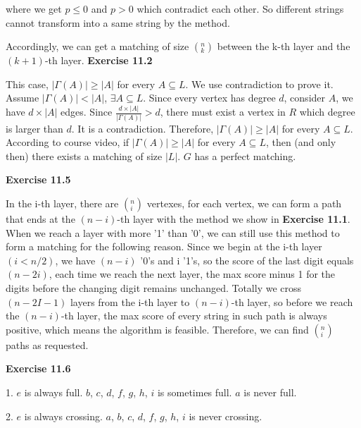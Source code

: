 \documentclass{article} %
\begin{document}
	 where we get $p\leq 0$ and $p>0$ which contradict each other. So  different strings cannot transform into a same string by the method.\par
	 
	 Accordingly, we can get a matching of size $(^n _k)$ between the k-th layer and the $(k+1)$-th layer.
\textbf{Exercise 11.2}\par
	This case, $|\Gamma(A)|\ge |A|$ for every $A\subseteq L$. We use contradiction to prove it. 
	Assume $|\Gamma(A)|<|A|$, $\exists A\subseteq L$. Since every vertex has degree $d$, consider $A$, we have $d\times |A|$ edges. 
	Since $\frac{d\times|A|}{|\Gamma(A)|}>d$, there must exist a vertex in $R$ which degree is larger than $d$. It is a contradiction. 
	Therefore, $|\Gamma(A)|\ge |A|$ for every $A\subseteq L$. According to course video, if $|\Gamma(A)|\ge |A|$ for every $A\subseteq L$,
	then (and only then) there exists a matching of size $|L|$. $G$ has a perfect matching.\par 	 
\textbf{Exercise 11.5}\par	 
	In the i-th layer, there are $(^n _i)$ vertexes, for each vertex, we can form a path that ends at the $(n-i)$-th layer with the method we show in \textbf{Exercise 11.1}. When we reach a layer with more '1' than '0', we can still use this method to form a matching for the following reason. Since we begin at the i-th layer$(i<n/2)$, we have $(n-i)$ '0's and i '1's, so the score of the last digit equals $(n-2i)$, each time we reach the next layer, the max score minus 1 for the  digits before the changing digit remains unchanged. Totally we cross $(n-2I-1)$ layers from the i-th layer to $(n-i)$-th layer, so before we reach the $(n-i)$-th layer, the max score of every string in such path is always positive, which means the algorithm is feasible. Therefore, we can find $(^n _i)$ paths as requested.

\textbf{Exercise 11.6}\par
	1. $e$ is always full. $b$, $c$, $d$, $f$, $g$, $h$, $i$ is sometimes full. $a$ is never full.\par
	2. $e$ is always crossing. $a$, $b$, $c$, $d$, $f$, $g$, $h$, $i$ is never crossing.\par
	
\end{document}
